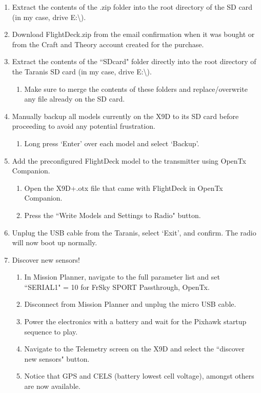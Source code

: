 \documentclass[12pt,journal,compsoc]{IEEEtran}
\begin{document}
\begin{enumerate}
\item Extract the contents of the .zip folder into the root directory of the SD card (in my case, drive E:\textbackslash).
\item Download FlightDeck.zip from the email confirmation when it was bought or from the Craft and Theory account created for the purchase.
\item Extract the contents of the ``SDcard" folder directly into the root directory of the Taranis SD card (in my case, drive E:\textbackslash).
	\begin{enumerate}
	\item Make sure to merge the contents of these folders and replace/overwrite any file already on the SD card.
	\end{enumerate}
\item Manually backup all models currently on the X9D to its SD card before proceeding to avoid any potential frustration.
	\begin{enumerate}
	\item Long press `Enter' over each model and select `Backup'.
	\end{enumerate}
\item Add the preconfigured FlightDeck model to the transmitter using OpenTx Companion.
	\begin{enumerate}
	\item Open the X9D+.otx file that came with FlightDeck in OpenTx Companion.
	\item Press the ``Write Models and Settings to Radio" button.
	\end{enumerate}
\item Unplug the USB cable from the Taranis, select `Exit', and confirm. The radio will now boot up normally.
\item Discover new sensors!
	\begin{enumerate}
	\item In Mission Planner, navigate to the full parameter list and set ``SERIAL1" = 10 for FrSky SPORT Passthrough, OpenTx.
	\item Disconnect from Mission Planner and unplug the micro USB cable.
	\item Power the electronics with a battery and wait for the Pixhawk startup sequence to play.
	\item Navigate to the Telemetry screen on the X9D and select the ``discover new sensors" button.
	\item Notice that GPS and CELS (battery lowest cell voltage), amongst others are now available.
	\end{enumerate}
\end{enumerate}
\end{document}
